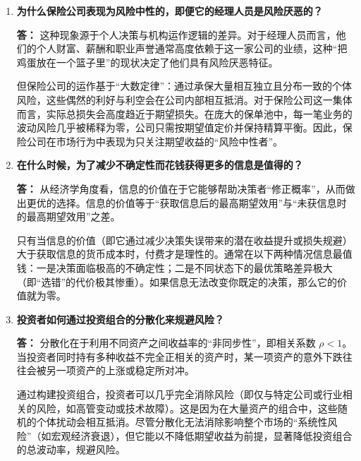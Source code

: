 \begin{enumerate}[label=\textbf{\arabic*.}, leftmargin=*]
\begin{center}
		\end{center}
		
		\item \textbf{为什么保险公司表现为风险中性的，即便它的经理人员是风险厌恶的？}
		
		\textbf{答：}
		这种现象源于个人决策与机构运作逻辑的差异。对于经理人员而言，他们的个人财富、薪酬和职业声誉通常高度依赖于这一家公司的业绩，这种“把鸡蛋放在一个篮子里”的现状决定了他们具有风险厌恶特征。
		
		但保险公司的运作基于“大数定律”：通过承保大量相互独立且分布一致的个体风险，这些偶然的利好与利空会在公司内部相互抵消。对于保险公司这一集体而言，实际总损失会高度趋近于期望损失。在庞大的保单池中，每一笔业务的波动风险几乎被稀释为零，公司只需按期望值定价并保持精算平衡。因此，保险公司在市场行为中表现为只关注期望收益的“风险中性者”。
		
		\item \textbf{在什么时候，为了减少不确定性而花钱获得更多的信息是值得的？}
		
		\textbf{答：}
		从经济学角度看，信息的价值在于它能够帮助决策者“修正概率”，从而做出更优的选择。信息的价值等于“获取信息后的最高期望效用”与“未获信息时的最高期望效用”之差。
		
		只有当信息的价值（即它通过减少决策失误带来的潜在收益提升或损失规避）大于获取信息的货币成本时，付费才是理性的。通常在以下两种情况信息最值钱：一是决策面临极高的不确定性；二是不同状态下的最优策略差异极大（即“选错”的代价极其惨重）。如果信息无法改变你既定的决策，那么它的价值就为零。
		
		\item \textbf{投资者如何通过投资组合的分散化来规避风险？}
		
		\textbf{答：}
		分散化在于利用不同资产之间收益率的“非同步性”，即相关系数 $\rho < 1$。当投资者同时持有多种收益不完全正相关的资产时，某一项资产的意外下跌往往会被另一项资产的上涨或稳定所对冲。
		
		通过构建投资组合，投资者可以几乎完全消除风险（即仅与特定公司或行业相关的风险，如高管变动或技术故障）。这是因为在大量资产的组合中，这些随机的个体扰动会相互抵消。尽管分散化无法消除影响整个市场的“系统性风险”（如宏观经济衰退），但它能以不降低期望收益为前提，显著降低投资组合的总波动率，规避风险。
		

\end{enumerate}
